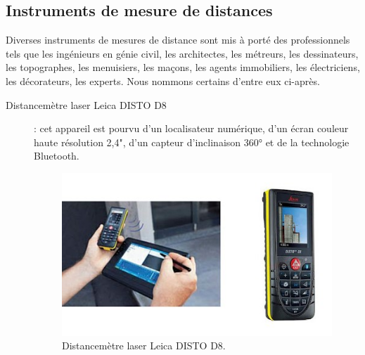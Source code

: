 \documentclass[a4paper, 12pt]{book}
\begin{document}
\subsection{Instruments de mesure de distances}
Diverses instruments de mesures de distance sont mis à porté des professionnels tels que les ingénieurs en génie civil, les architectes, les métreurs, les dessinateurs, les topographes, les menuisiers, les maçons, les agents immobiliers, les électriciens, les décorateurs, les experts. Nous nommons certains d'entre eux ci-après.
\begin{description}
	\item[Distancemètre laser Leica DISTO D8]: cet appareil est pourvu d'un localisateur numérique, d'un écran couleur haute résolution 2,4", d'un capteur d'inclinaison 360° et de la technologie Bluetooth. 
	
\begin{figure}[H]
 	\begin{center}
 		\hspace{2cm}
		\includegraphics[scale=0.55]{images/instrument1.jpg} \hspace{2cm}
		\caption{Distancemètre laser Leica DISTO D8.\label{fig-instrument1}}
  	\end{center}
\end{figure}


\end{description}
\end{document}
